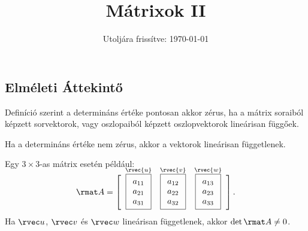 \documentclass[a4paper, 12pt]{scrartcl}
\title{Mátrixok II}
\date{Utoljára frissítve: \today}
\begin{document}
\maketitle
\subsection{Elméleti Áttekintő}

\begin{blueBox}

  Definíció szerint a determináns értéke pontosan akkor zérus, ha a mátrix
  soraiból képzett sorvektorok, vagy oszlopaiból képzett oszlopvektorok
  lineárisan függőek.

  Ha a determináns értéke nem zérus, akkor a vektorok lineárisan függetlenek.

  Egy $3 \times 3$-as mátrix esetén például:
  $$
    \rmat A =
    \left[
      \begin{array}{ccc}
        \\[-8mm]
        \overset{\rvec{u}}{\boxed{\begin{array}{c}
                                        a_{11} \\
                                        a_{21} \\
                                        a_{31}
                                      \end{array}}}
         & \overset{\rvec{v}}{\boxed{\begin{array}{c}
                                           a_{12} \\
                                           a_{22} \\
                                           a_{32}
                                         \end{array}}}
         & \overset{\rvec{w}}{\boxed{\begin{array}{c}
                                           a_{13} \\
                                           a_{23} \\
                                           a_{33}
                                         \end{array}}}
      \end{array}
    \right]
    \text.
  $$
  Ha $\rvec u$, $\rvec v$ és $\rvec w$ lineárisan függetlenek,
  akkor $\det \rmat A \neq 0$.
\end{blueBox}
\end{document}
